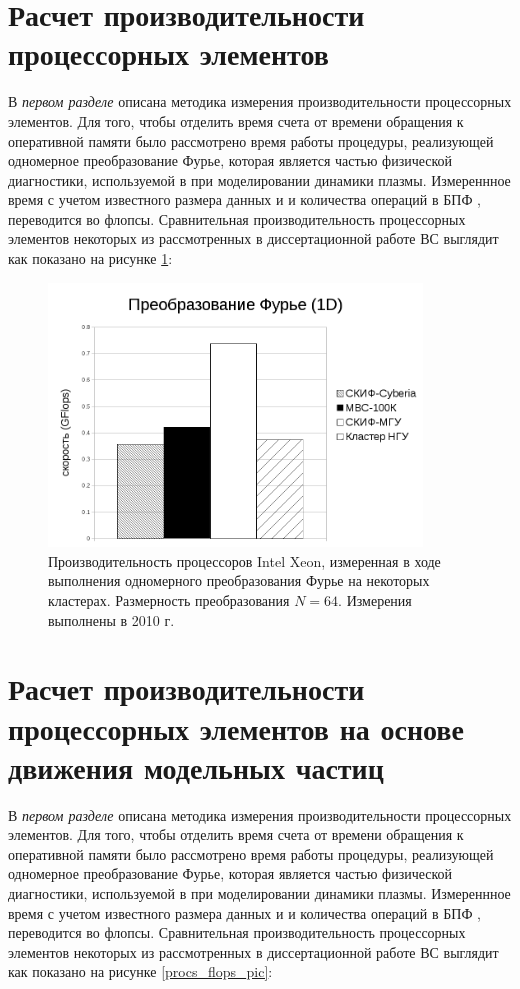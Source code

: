 \section{Расчет производительности процессорных элементов}
\label{calc_PE}
В \textit{первом разделе} описана методика измерения производительности процессорных элементов.
Для того, чтобы отделить время счета от времени обращения к оперативной памяти было рассмотрено время работы процедуры,
реализующей одномерное преобразование Фурье, которая является частью физической диагностики, используемой в при моделировании динамики плазмы. Измереннное время с учетом известного размера данных и и количества операций в БПФ , переводится во флопсы. Сравнительная производительность процессорных элементов некоторых из рассмотренных в диссертационной работе ВС выглядит как показано на рисунке  \ref{procs_flops}:

\begin{figure}[htb]
	\begin{center}
		\includegraphics[height=7cm,keepaspectratio]{images/processor_FLOPS.png}
	\end{center}
	\caption{Производительность процессоров Intel Xeon, измеренная в ходе выполнения одномерного преобразования Фурье на некоторых кластерах. Размерность преобразования $N=64$. Измерения выполнены в 2010 г.}
	\label{procs_flops}
\end{figure} 


\section{Расчет производительности процессорных элементов на основе движения модельных частиц}
\label{calc_PE}
В \textit{первом разделе} описана методика измерения производительности процессорных элементов.
Для того, чтобы отделить время счета от времени обращения к оперативной памяти было рассмотрено время работы процедуры,
реализующей одномерное преобразование Фурье, которая является частью физической диагностики, используемой в при моделировании динамики плазмы. Измереннное время с учетом известного размера данных и и количества операций в БПФ , переводится во флопсы. Сравнительная производительность процессорных элементов некоторых из рассмотренных в диссертационной работе ВС выглядит как показано на рисунке  \ref{procs_flops_pic}:


